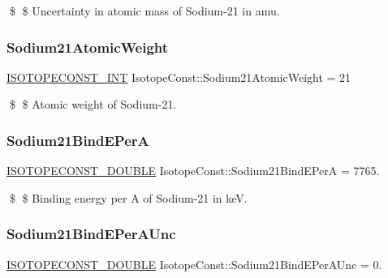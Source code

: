 \$ \$ Uncertainty in atomic mass of Sodium-\/21 in amu. \mbox{\label{group___isotope_const-_sodium-_na21_ga9cc4ac715fb16ef598804af04b6d8eec}} 
\subsubsection{\texorpdfstring{Sodium21\+Atomic\+Weight}{Sodium21AtomicWeight}}
{\footnotesize\ttfamily \mbox{\hyperlink{group___isotope_const-_macros_ga5f18360b3e99483a35c32d789e62621c}{I\+S\+O\+T\+O\+P\+E\+C\+O\+N\+S\+T\+\_\+\+I\+NT}} Isotope\+Const\+::\+Sodium21\+Atomic\+Weight = 21}

\$ \$ Atomic weight of Sodium-\/21. \mbox{\label{group___isotope_const-_sodium-_na21_gacf7770bf667726cc4e836118654469dc}} 
\subsubsection{\texorpdfstring{Sodium21\+Bind\+E\+PerA}{Sodium21BindEPerA}}
{\footnotesize\ttfamily \mbox{\hyperlink{group___isotope_const-_macros_ga8f45a7272ce02c0b4c65c44636ed719a}{I\+S\+O\+T\+O\+P\+E\+C\+O\+N\+S\+T\+\_\+\+D\+O\+U\+B\+LE}} Isotope\+Const\+::\+Sodium21\+Bind\+E\+PerA = 7765.}

\$ \$ Binding energy per A of Sodium-\/21 in keV. \mbox{\label{group___isotope_const-_sodium-_na21_gaae52ac53e219579b43ee3b617959b07e}} 
\subsubsection{\texorpdfstring{Sodium21\+Bind\+E\+Per\+A\+Unc}{Sodium21BindEPerAUnc}}
{\footnotesize\ttfamily \mbox{\hyperlink{group___isotope_const-_macros_ga8f45a7272ce02c0b4c65c44636ed719a}{I\+S\+O\+T\+O\+P\+E\+C\+O\+N\+S\+T\+\_\+\+D\+O\+U\+B\+LE}} Isotope\+Const\+::\+Sodium21\+Bind\+E\+Per\+A\+Unc = 0.}

